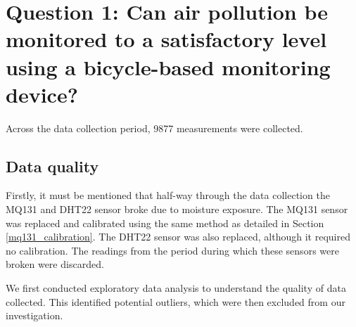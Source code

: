 \documentclass[11pt]{report}
\begin{document}
\section{Question 1: Can air pollution be monitored to a satisfactory level using a bicycle-based monitoring device?} \label{q1_results}

Across the data collection period, \num{9877} measurements were collected.

\subsection{Data quality}

Firstly, it must be mentioned that half-way through the data collection the MQ131 and DHT22 sensor broke due to moisture exposure. The MQ131 sensor was replaced and calibrated using the same method as detailed in Section \ref{mq131_calibration}. The DHT22 sensor was also replaced, although it required no calibration. The readings from the period during which these sensors were broken were discarded.

We first conducted exploratory data analysis to understand the quality of data collected. This identified potential outliers, which were then excluded from our investigation.
\end{document}
